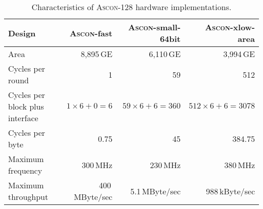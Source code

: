 \documentclass[runningheads]{llncs}
\begin{document}
\begin{table}[htb]
  \caption{Characteristics of \textsc{Ascon}-128 hardware implementations.}
\label{tbl:hw-char}
\centering
\begin{tabular}{l@{\hskip 12pt}r@{\hskip 12pt}r@{\hskip 12pt}r} \toprule
  Design & \textsc{Ascon}-fast & \textsc{Ascon}-small-64bit & \textsc{Ascon}-xlow-area \\
  \midrule
  Area                             & 8,895\,GE            & 6,110\,GE               & 3,994\,GE                 \\
  Cycles per round                 & 1                    & 59                      & 512                       \\
  Cycles per block plus interface  & $1 \times 6 + 0 = 6$ & $59 \times 6 + 6 = 360$ & $512 \times 6 + 6 = 3078$ \\
  Cycles per byte                  & 0.75                 & 45                      & 384.75                    \\
  Maximum frequency                & 300\,MHz             & 230\,MHz                & 380\,MHz                  \\
  Maximum throughput               & 400\,MByte/sec       & 5.1\,MByte/sec          & 988\,kByte/sec            \\
  \bottomrule %
\end{tabular}
\end{table}%



\vspace*{-.5cm} %

\newpage

 

\appendix
\end{document}
